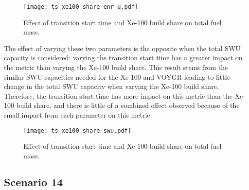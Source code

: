 \begin{figure}[h!]
    \centering
    \texttt{[image: ts\_xe100\_share\_enr\_u.pdf]}
    \caption{Effect of transition start time and Xe-100 build share 
    on total fuel mass.}
    \label{fig:ts_xe100_share_enr_u}
\end{figure}

The effect of varying these two parameters is the opposite when the total 
\gls{SWU} capacity is considered: varying the transition start time has 
a greater impact on the metric than varying the Xe-100 build share. This 
result stems from the similar \gls{SWU} capacities needed for the Xe-100 
and VOYGR leading to little change in the total \gls{SWU} capacity when 
varying the Xe-100 build share. Therefore, the transition start time has 
more impact on this metric than the Xe-100 build share, and there is little 
of a combined effect observed because of the small impact from each parameter 
on this metric. 

\begin{figure}[h!]
    \centering
    \texttt{[image: ts\_xe100\_share\_swu.pdf]}
    \caption{Effect of transition start time and Xe-100 build share 
    on total fuel mass.}
    \label{fig:ts_xe100_share_swu}
\end{figure}

\subsection{Scenario 14}